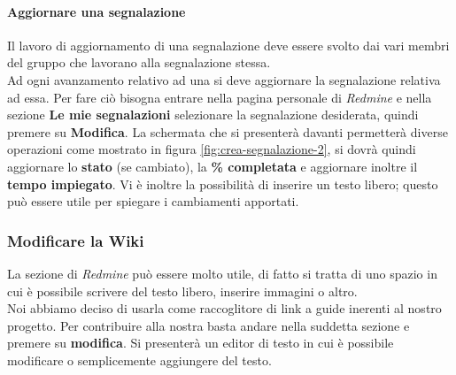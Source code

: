 \documentclass{scalatekids-article}
\begin{document}
\paragraph{Aggiornare una segnalazione}
Il lavoro di aggiornamento di una segnalazione deve essere svolto dai vari
membri del gruppo che lavorano alla segnalazione stessa.\\ Ad ogni avanzamento
relativo ad una  si deve aggiornare la segnalazione relativa ad
essa. Per fare ciò bisogna entrare nella pagina personale di \textit{Redmine} e
nella sezione \textbf{Le mie segnalazioni} selezionare la segnalazione
desiderata, quindi premere su \textbf{Modifica}. La schermata che si presenterà
davanti permetterà diverse operazioni come mostrato in figura
\ref{fig:crea-segnalazione-2}, si dovrà quindi aggiornare lo \textbf{stato} (se
cambiato), la \textbf{\% completata} e aggiornare inoltre il \textbf{tempo
  impiegato}. Vi è inoltre la possibilità di inserire un testo libero; questo
può essere utile per spiegare i cambiamenti apportati.
\subsubsection{Modificare la Wiki}
La sezione  di \textit{Redmine} può essere molto utile, di fatto si tratta di uno spazio in cui è possibile scrivere del testo libero, inserire immagini o altro.\\
Noi abbiamo deciso di usarla come raccoglitore di link a guide inerenti al nostro progetto.
Per contribuire alla nostra  basta andare nella suddetta sezione e premere su \textbf{modifica}. Si presenterà un editor di testo in cui è possibile modificare o semplicemente aggiungere del testo.
\end{document}

